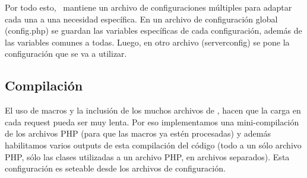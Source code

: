 Por todo esto, \PWB \ mantiene un archivo de configuraciones múltiples para adaptar cada una a una necesidad específica. En un archivo de configuración global (config.php) se guardan las variables específicas de cada configuración, además de las variables comunes a todas. Luego, en otro archivo (serverconfig) se pone la configuración que se va a utilizar.

\subsection{Compilación}

El uso de macros y la inclusión de los muchos archivos de \PWB, hacen que la carga en cada request pueda ser muy lenta. Por eso implementamos una mini-compilación de los archivos PHP (para que las macros ya estén procesadas) y además habilitamos varios outputs de esta compilación del código (todo a un sólo archivo PHP, sólo las clases utilizadas a un archivo PHP, en archivos separados). Esta configuración es seteable desde los archivos de configuración.
